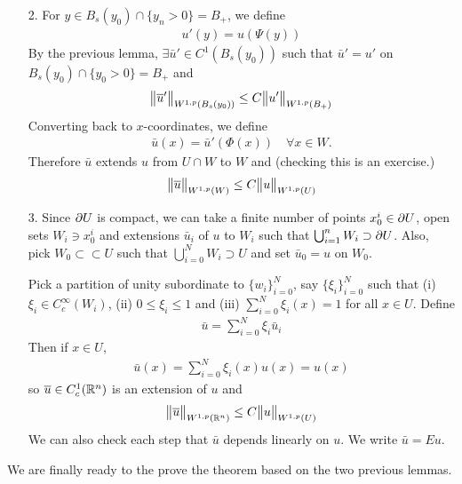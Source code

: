 \documentclass[12pt,a4paper]{report}
\newenvironment{proof}
{\begin{changemargin}{1cm}{0.5cm} 
	}%
	{\end{changemargin}
}
\begin{document}
\begin{proof}
\begin{itemize}
\item[2.] For $y\in B_s(y_0) \cap \{y_n >0 \} = B_+$, we define
\begin{align*}
u'(y) = u(\Psi(y))
\end{align*}
By the previous lemma, $\exists \bar{u}' \in C^1 (B_s(y_0))$ such that $\bar{u}' = u'$ on $B_s(y_0) \cap \{y_0 >0\} = B_+$ and
\begin{align*}
\bigl\lVert\overline{u}'\bigr\rVert_{W^{1,p}(B_s(y_0))} \leq C \bigl\lVert u'\bigr\rVert_{W^{1,p}(B_+)}
\end{align*}
Converting back to $x$-coordinates, we define
\begin{align*}
\bar{u}(x) = \bar{u}' (\Phi(x)) \quad \forall x\in W. 
\end{align*}
Therefore $\bar{u}$ extends $u$ from $U\cap W$ to $W$ and (checking this is an exercise.)
\begin{align*}
\bigl\lVert\overline{u}\bigr\rVert_{W^{1,p}(W)} \leq C\bigl\lVert u\bigr\rVert_{W^{1,p}(U)}
\end{align*}
\item[3.] Since $\partial U$ is compact, we can take a finite number of points $x^i_0 \in \partial U$, open sets $W_i \ni x_0^i$ and extensions $\bar{u}_i$ of $u$ to $W_i$ such that $\bigcup_{i=1}^n W_i \supset \partial U$. Also, pick $W_0 \subset \subset U$ such that $\bigcup_{i=0}^N W_i \supset U$ and set $\bar{u}_0 =u$ on $W_0$.

\quad Pick a partition of unity subordinate to $\{w_i\}_{i=0}^N$, say $\{\xi_i \}_{i=0}^N$ such that (i) $\xi_i \in C_c^{\infty}(W_i)$, (ii) $0\leq \xi_i \leq 1$ and (iii) $\sum_{i=0}^N \xi_i(x) =1$ for all $x\in U$. Define
\begin{align*}
\bar{u} = \sum_{i=0}^N \xi_i \bar{u}_i
\end{align*}
Then if $x\in U$,
\begin{align*}
\bar{u}(x) = \sum_{i=0}^N \xi_i(x) u(x) = u(x)
\end{align*}
so $\overline{u} \in C_c^1(\mathbb{R}^n)$ is an extension of $u$ and
\begin{align*}
\bigl\lVert\overline{u}\bigr\rVert_{W^{1,p}(\mathbb{R}^n)} \leq C \bigl\lVert u\bigr\rVert_{W^{1,p}(U)}
\end{align*}
We can also check each step that $\bar{u}$ depends linearly on $u$. We write $\bar{u} = Eu$. 
\end{itemize}

\eop
\end{proof}
\s

We are finally ready to the prove the theorem based on the two previous lemmas.
\s
\end{document}
